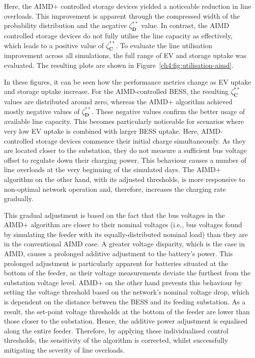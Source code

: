 Here, the AIMD+ controlled storage devices yielded a noticeable reduction in line overloads. This improvement is apparent through the compressed width of the probability distribution and the negative $\zeta_\textbf{D}^{**}$ value. In contrast, the AIMD controlled storage devices do not fully utilise the line capacity as effectively, which leads to a positive value of $\zeta_\textbf{C}^{**}$. To evaluate the line utilisation improvement across all simulations, the full range of EV and storage uptake was evaluated. The resulting plots are shown in Figure~\ref{ch4:fig:utilisation-aimd}.



In these figures, it can be seen how the performance metrics change as EV uptake and storage uptake increase.
For the AIMD-controlled BESS, the resulting $\zeta_\textbf{C}^{**}$ values are distributed around zero, whereas the AIMD+ algorithm achieved mostly negative values of $\zeta_\textbf{D}^{**}$.
These negative values confirm the better usage of available line capacity. This becomes particularly noticeable for scenarios where very low EV uptake is combined with larger BESS uptake.
Here, AIMD-controlled storage devices commence their initial charge simultaneously.
As they are located closer to the substation, they do not measure a sufficient bus voltage offset to regulate down their charging power.
This behaviour causes a number of line overloads at the very beginning of the simulated days.
The AIMD+ algorithm on the other hand, with its adjusted thresholds, is more responsive to non-optimal network operation and, therefore, increases the charging rate gradually.

This gradual adjustment is based on the fact that the bus voltages in the AIMD+ algorithm are closer to their nominal voltages (i.e., bus voltages found by simulating the feeder with its equally-distributed nominal load) than they are in the conventional AIMD case. A greater voltage disparity, which is the case in AIMD, causes a prolonged additive adjustment to the battery's power. This prolonged adjustment is particularly apparent for batteries situated at the bottom of the feeder, as their voltage measurements deviate the furthest from the substation voltage level. AIMD+ on the other hand prevents this behaviour by setting the voltage threshold based on the network's nominal voltage drop, which is dependent on the distance between the BESS and its feeding substation. As a result, the set-point voltage thresholds at the bottom of the feeder are lower than those closer to the substation. Hence, the additive power adjustment is equalised along the entire feeder. Therefore, by applying these individualised control thresholds, the sensitivity of the algorithm is corrected, whilst successfully mitigating the severity of line overloads.

